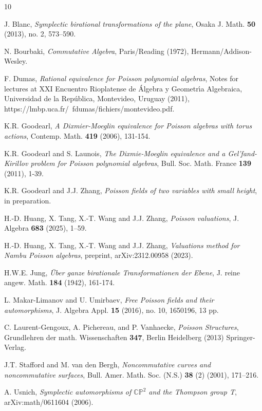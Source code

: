 \documentclass[12pt]{amsart}
\theoremstyle{plain}
\numberwithin{theorem}{section}
\numberwithin{equation}{theorem}
\theoremstyle{definition}
\begin{document}
\begin{thebibliography}{10}

J. Blanc,
\emph{Symplectic birational transformations of the plane},
Osaka J. Math. {\bf 50} (2013), no. 2, 573--590.

N. Bourbaki, \emph{Commutative Algebra},
Paris/Reading (1972), Hermann/Addison-Wesley.

F. Dumas,
\emph{Rational equivalence for Poisson polynomial algebras},
Notes for lectures at XXI Encuentro Rioplatense de \'Algebra y Geometr\'\i a Algebraica, Universidad de la Rep\'ublica, Montevideo, Uruguay (2011),
https://lmbp.uca.fr/~fdumas/fichiers/montevideo.pdf.

K.R. Goodearl, \emph{A Dixmier-Moeglin equivalence for Poisson algebras with torus actions},
Contemp. Math. \textbf{419} (2006), 131-154.

K.R. Goodearl and S. Launois,
\emph{The Dixmie-Moeglin equivalence and a Gel'fand-Kirillov problem for Poisson polynomial algebras},
Bull. Soc. Math. France \textbf{139} (2011), 1-39.

K.R. Goodearl and J.J. Zhang,
\emph{Poisson fields of two variables
with small height}, 
in preparation.

H.-D. Huang, X. Tang, X.-T. Wang and J.J. Zhang, 
\emph{Poisson valuations},
J. Algebra {\bf 683} (2025), 1--59.

H.-D. Huang, X. Tang, X.-T. Wang and J.J. Zhang, 
\emph{Valuations method for Nambu Poisson algebras}, preprint, arXiv:2312.00958
(2023). 

H.W.E. Jung, \emph{\"Uber ganze birationale Transformationen der Ebene}, J. reine angew. Math. \textbf{184} (1942), 161-174.

L. Makar-Limanov and U. Umirbaev, \emph{Free Poisson fields and their automorphisms}, J. Algebra Appl. {\bf 15} (2016), no. 10, 1650196, 13 pp.

C. Laurent-Gengoux, A. Pichereau, and P. Vanhaecke, \emph{Poisson Structures}, Grundlehren der
math. Wissenschaften \textbf{347}, Berlin Heidelberg (2013) Springer-Verlag.

J.T. Stafford and M. van den Bergh, 
\emph{Noncommutative curves and noncommutative surfaces}, 
Bull. Amer. Math. Soc. (N.S.) \textbf{38} (2) (2001), 171--216.

A. Usnich, \emph{Symplectic automorphisms of 
${\mathbb {CP}}^2$ and the Thompson group T}, arXiv:math/0611604
(2006).

\end{thebibliography}
\end{document}
